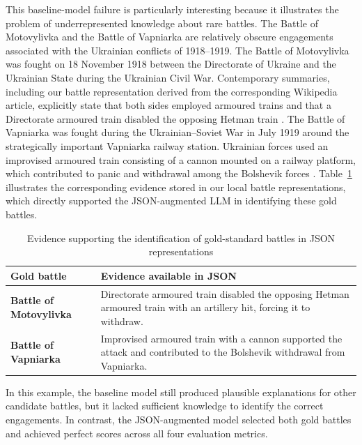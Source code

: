 This baseline-model failure is particularly interesting because it illustrates the problem of underrepresented knowledge about rare battles. The Battle of Motovylivka and the Battle of Vapniarka are relatively obscure engagements associated with the Ukrainian conflicts of 1918–1919. The Battle of Motovylivka was fought on 18 November 1918 between the Directorate of Ukraine and the Ukrainian State during the Ukrainian Civil War. Contemporary summaries, including our battle representation derived from the corresponding Wikipedia article, explicitly state that both sides employed armoured trains and that a Directorate armoured train disabled the opposing Hetman train \citep{wikipedia2026motovilivka}. The Battle of Vapniarka was fought during the Ukrainian–Soviet War in July 1919 around the strategically important Vapniarka railway station. Ukrainian forces used an improvised armoured train consisting of a cannon mounted on a railway platform, which contributed to panic and withdrawal among the Bolshevik forces \citep{wikipedia2026vapniarka}. Table~\ref{tab:oracle_json_evidence} illustrates the corresponding evidence stored in our local battle representations, which directly supported the JSON-augmented LLM in identifying these gold battles.
\begin{table}[H]
    \centering
    \caption{Evidence supporting the identification of gold-standard battles in JSON representations}
    \label{tab:oracle_json_evidence}

    \small
    \renewcommand{\arraystretch}{1.5}
    \setlength{\tabcolsep}{6pt}

    \begin{tabular}{
        >{\raggedright\arraybackslash}p{}
        >{\raggedright\arraybackslash}p{}
    }
        \toprule
        \textbf{Gold battle} &
        \textbf{Evidence available in JSON} \\
        \midrule

        \textbf{Battle of Motovylivka} &
        Directorate armoured train disabled the opposing
        Hetman armoured train with an artillery hit,
        forcing it to withdraw. \\
        \midrule

        \textbf{Battle of Vapniarka} &
        Improvised armoured train with a cannon supported
        the attack and contributed to the Bolshevik
        withdrawal from Vapniarka. \\

        \bottomrule
    \end{tabular}
\end{table}
In this example, the baseline model still produced plausible explanations for other candidate battles, but it lacked sufficient knowledge to identify the correct engagements. In contrast, the JSON-augmented model selected both gold battles and achieved perfect scores across all four evaluation metrics.
